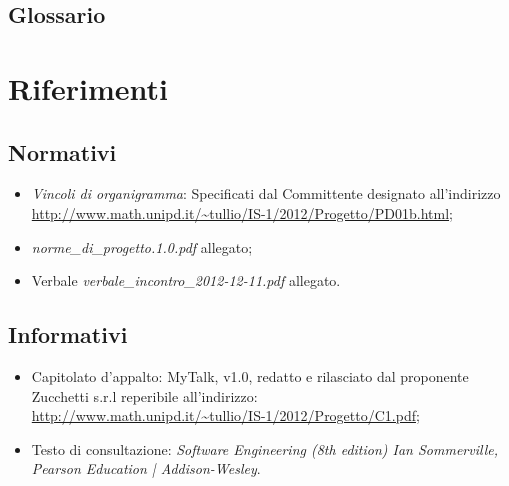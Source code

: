 \subsection{Glossario}
\glossaryIntro
\section{Riferimenti}
\subsection{Normativi}
\begin{itemize}
\item[] \textit{Vincoli di organigramma}: Specificati dal Committente designato all'indirizzo\\ \url{http://www.math.unipd.it/~tullio/IS-1/2012/Progetto/PD01b.html};
\item[] \textit{norme\_di\_progetto.1.0.pdf} allegato;
\item[] Verbale \textit{verbale\_incontro\_2012-12-11.pdf} allegato.
\end{itemize}

\subsection{Informativi}
\begin{itemize}
\item[] Capitolato d'appalto: MyTalk, v1.0, redatto e rilasciato dal proponente Zucchetti s.r.l reperibile all'indirizzo: \\ \url{http://www.math.unipd.it/~tullio/IS-1/2012/Progetto/C1.pdf};
\item[] Testo di consultazione: \textit{Software Engineering (8th edition) Ian Sommerville, Pearson Education | Addison-Wesley}.
\end{itemize}
\clearpage
